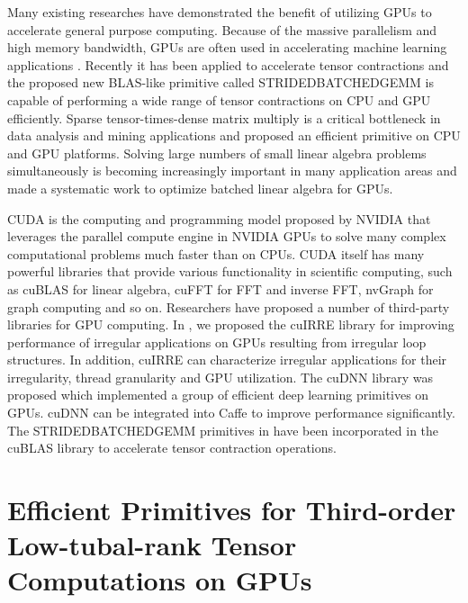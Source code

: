\documentclass[format=acmsmall, review=false, screen=true]{acmart}
\begin{document}
Many existing researches \cite{jing2016energy} \cite{zhang2015buddy} \cite{zhang2015efficient} \cite{zhang2014cuirre} \cite{zhang2016efficient} have demonstrated the benefit of utilizing GPUs to accelerate general purpose computing. Because of the massive parallelism and high memory bandwidth, GPUs are often used in accelerating machine learning applications \cite{chetlur2014cudnn} \cite{cui2016geeps} \cite{tsung2016high} \cite{banasiak2016statistical}.  Recently it has been applied to accelerate tensor contractions \cite{shi2016tensor} and the proposed new BLAS-like primitive called STRIDEDBATCHEDGEMM is capable of performing a wide range of tensor contractions on CPU and GPU efficiently. Sparse tensor-times-dense matrix multiply is a critical bottleneck in data analysis and mining applications and \cite{li2016optimizing} proposed an efficient primitive on CPU and GPU platforms. Solving large numbers of small linear algebra problems simultaneously is becoming increasingly important in many application areas and \cite{dongarra2017optimized} made a systematic work to optimize batched linear algebra for GPUs.

CUDA is the computing and programming model proposed by NVIDIA that leverages the parallel compute engine in NVIDIA GPUs to solve many complex computational problems much faster than on CPUs. CUDA itself has many powerful libraries that provide various functionality in scientific computing, such as cuBLAS \cite{CUBLAS} for linear algebra, cuFFT \cite{CUFFT} for FFT and inverse FFT, nvGraph \cite{NVGRAPH} for graph computing and so on. Researchers have proposed a number of third-party libraries for GPU computing. In \cite{zhang2014cuirre}, we proposed the cuIRRE library for improving performance of irregular applications on GPUs resulting from irregular loop structures. In addition, cuIRRE can characterize irregular applications for their irregularity, thread granularity and GPU utilization. The cuDNN library \cite{chetlur2014cudnn} was proposed which implemented a group of efficient deep learning primitives on GPUs. cuDNN can be integrated into Caffe to improve performance significantly. The STRIDEDBATCHEDGEMM primitives in \cite{shi2016tensor} have been incorporated in the cuBLAS \cite{CUBLAS} library to accelerate tensor contraction operations.

\section{Efficient Primitives for Third-order Low-tubal-rank Tensor Computations on GPUs}
\end{document}
